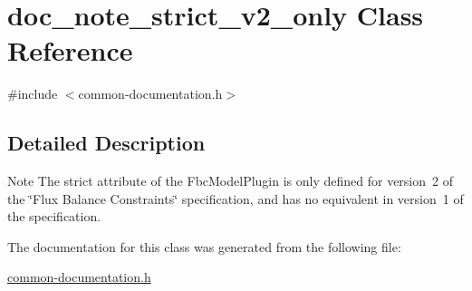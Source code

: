 \hypertarget{classdoc__note__strict__v2__only}{}\section{doc\+\_\+note\+\_\+strict\+\_\+v2\+\_\+only Class Reference}
\label{classdoc__note__strict__v2__only}


{\ttfamily \#include $<$common-\/documentation.\+h$>$}



\subsection{Detailed Description}
\begin{DoxyNote}{Note}
The \textquotesingle{}strict\textquotesingle{} attribute of the Fbc\+Model\+Plugin is only defined for version~2 of the \char`\"{}\+Flux Balance Constraints\char`\"{} specification, and has no equivalent in version~1 of the specification. 
\end{DoxyNote}


The documentation for this class was generated from the following file\+:\begin{DoxyCompactItemize}
\item 
\hyperlink{common-documentation_8h}{common-\/documentation.\+h}\end{DoxyCompactItemize}

